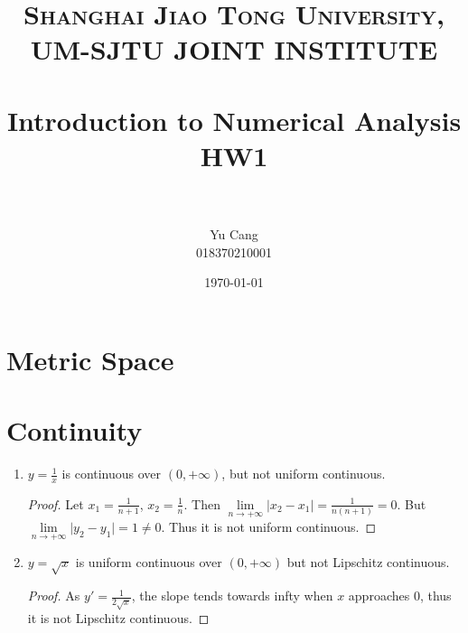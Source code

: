 \documentclass[paper=a4, fontsize=11pt]{scrartcl} %
\title{	
\normalfont \normalsize 
\textsc{Shanghai Jiao Tong University, UM-SJTU JOINT INSTITUTE} \\ [25pt] %
\horrule{0.5pt} \\[0.4cm] %
\huge Introduction to Numerical Analysis \\ HW1 \\ %
\horrule{2pt} \\[0.5cm] %
}
\author{Yu Cang \\ 018370210001} %
\date{\normalsize\today} %
\numberwithin{equation}{section} %
\numberwithin{figure}{section} %
\numberwithin{table}{section} %
\begin{document}
\maketitle %


\section{Metric Space}



\section{Continuity}

\begin{enumerate}
\item $y=\frac{1}{x}$ is continuous over $(0, +\infty)$, but not uniform continuous.
      \begin{proof}
      	Let $x_1 = \frac{1}{n+1}$,  $x_2 = \frac{1}{n}$. 
      	Then $\lim\limits_{n \rightarrow +\infty} \vert x_2-x_1 \vert = \frac{1}{n(n+1)} = 0 $.
      	But $\lim\limits_{n \rightarrow +\infty} \vert y_2- y_1 \vert = 1 \neq 0 $.
      	Thus it is not uniform continuous.
      \end{proof}
\item $y=\sqrt{x}$ is uniform continuous over $(0, +\infty)$ but not Lipschitz continuous.
	  \begin{proof}
	  	As $y\prime = \frac{1}{2\sqrt{x}}$, 
	  	the slope tends towards infty when $x$ approaches 0, 
	  	thus it is not Lipschitz continuous.  
	  \end{proof}
\end{enumerate}


\end{document}
